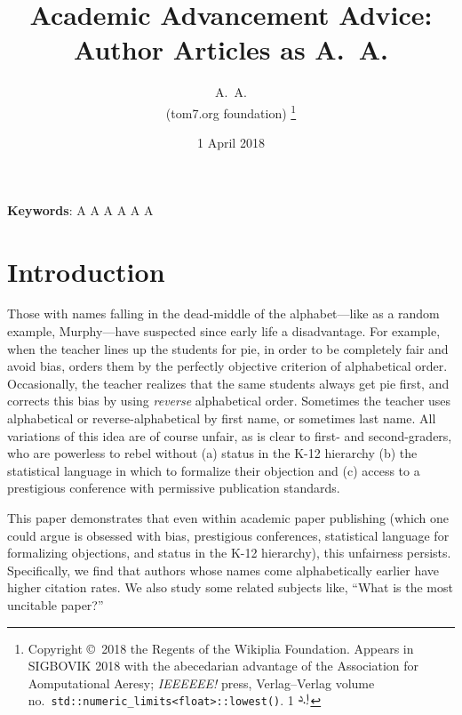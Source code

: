 \documentclass[twocolumn]{article}
\newcommand\dirham{\protect \includegraphics[width=1em]{dirham}}
\begin{document}
 


\title{Academic Advancement Advice: Author Articles as A.~A.}
\author{A.~A. \\
  (tom7.org foundation)
  \thanks{
    Copyright \copyright\ 2018 the Regents of the Wikiplia Foundation.
    Appears in SIGBOVIK 2018 with the abecedarian advantage of the
    Association for Aomputational Aeresy; {\em IEEEEEE!} press,
    Verlag--Verlag volume no.~{\tt std::numeric\_limits<float>::lowest()}.
    1 \dirham
} }

\renewcommand\>{$>$}
\newcommand\<{$<$}

\date{1 April 2018}

\maketitle


\vspace{1em}
{\noindent \small {\bf Keywords}:
  A A A A A A
}

\section{Introduction}

Those with names falling in the dead-middle of the alphabet---like as
a random example, Murphy---have suspected since early life a
disadvantage. For example, when the teacher lines up the students for
pie, in order to be completely fair and avoid bias, orders them by the
perfectly objective criterion of alphabetical order. Occasionally, the
teacher realizes that the same students always get pie first, and
corrects this bias by using {\em reverse} alphabetical order.
Sometimes the teacher uses alphabetical or reverse-alphabetical by
first name, or sometimes last name. All variations of this idea are of
course unfair, as is clear to first- and second-graders, who are
powerless to rebel without (a) status in the K-12 hierarchy (b) the
statistical language in which to formalize their objection and (c)
access to a prestigious conference with permissive publication
standards.

This paper demonstrates that even within academic paper publishing
(which one could argue is obsessed with bias, prestigious conferences,
statistical language for formalizing objections, and status in the
K-12 hierarchy), this unfairness persists. Specifically, we find that
authors whose names come alphabetically earlier have higher citation
rates. We also study some related subjects like, ``What is the most
uncitable paper?''
\end{document}
